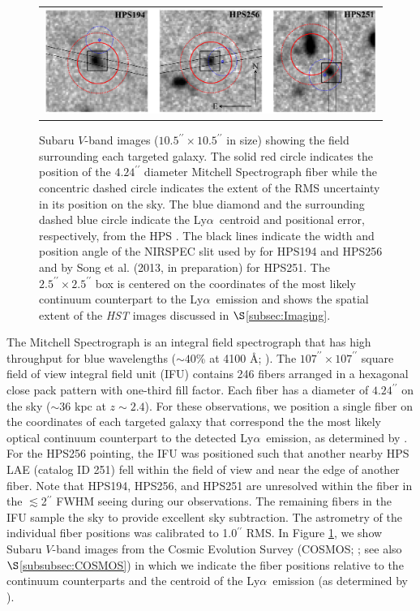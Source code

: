 \documentclass{emulateapj}
\newcommand{\lya}{Ly$\alpha$}
\def\arcsec{^{\prime\prime}}
\begin{document}
	\begin{figure}[t]
	\begin{center}
	\begin{tabular}{c}
	\includegraphics[width=17cm]{f1.png}
	\end{tabular}
	\end{center}
	\caption[example] 
	{ \label{fig:PointingThumbs} 
	Subaru $V$-band images ($10.5\arcsec\times10.5\arcsec$ in size) showing the field surrounding each targeted galaxy. The solid red circle indicates the position of the $4.24\arcsec$ diameter Mitchell Spectrograph fiber while the concentric dashed circle indicates the extent of the RMS uncertainty in its position on the sky. The blue diamond and the surrounding dashed blue circle indicate the \lya\ centroid and positional error, respectively, from the HPS \citep{adams2011}. The black lines indicate the width and position angle of the NIRSPEC slit used by \citet{finkelstein2011} for HPS194 and HPS256 and by Song et al. (2013, in preparation) for HPS251. The $2.5\arcsec\times2.5\arcsec$ box is centered on the coordinates of the most likely continuum counterpart to the \lya\ emission \citep{adams2011} and shows the spatial extent of the \textit{HST} images discussed in $\S$\ref{subsec:Imaging}.} 
	\end{figure} 

The Mitchell Spectrograph is an integral field spectrograph that has high throughput for blue wavelengths ($\sim40$\% at 4100 \AA; \citealp{hill2008b}). The $107\arcsec \times 107\arcsec$ square field of view integral field unit (IFU) contains 246 fibers arranged in a hexagonal close pack pattern with one-third fill factor. Each fiber has a diameter of $4.24\arcsec$ on the sky ($\sim$36 kpc at $z\sim2.4$). For these observations, we position a single fiber on the coordinates of each targeted galaxy that correspond the the most likely optical continuum counterpart to the detected \lya\ emission, as determined by \citet{adams2011}. For the HPS256 pointing, the IFU was positioned such that another nearby HPS LAE (catalog ID 251) fell within the field of view and near the edge of another fiber. Note that HPS194, HPS256, and HPS251 are unresolved within the fiber in the $\lesssim$2$\arcsec$ FWHM seeing during our observations. The remaining fibers in the IFU sample the sky to provide excellent sky subtraction. The astrometry of the individual fiber positions was calibrated to 1.0$\arcsec$ RMS. In Figure \ref{fig:PointingThumbs}, we show Subaru $V$-band images \citep{taniguchi2007} from the Cosmic Evolution Survey (COSMOS; \citealp{scoville2007}; see also $\S$\ref{subsubsec:COSMOS}) in which we indicate the fiber positions relative to the continuum counterparts and the centroid of the \lya\ emission (as determined by \citealp{adams2011}).
\end{document}
